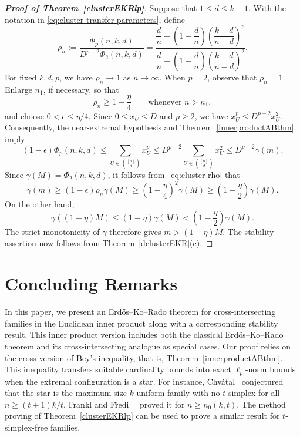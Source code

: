 \documentclass[11pt]{article}
\numberwithin{equation}{section}
\begin{document}
\begin{proof}[{\bf Proof of Theorem~\ref{clusterEKRlp}}]
Suppose that $1\leq d\leq k-1$.  With the notation in
	\eqref{eq:cluster-transfer-parameters}, define
	\begin{equation}\label{eq:cluster-rho}
		\rho_n:=
		\frac{\Phi_p(n,k,d)}{D^{p-2}\Phi_2(n,k,d)}
		=\frac{\dfrac dn+\left(1-\dfrac dn\right)
			\left(\dfrac{k-d}{n-d}\right)^p}
		{\dfrac dn+\left(1-\dfrac dn\right)
			\left(\dfrac{k-d}{n-d}\right)^2}.
	\end{equation}
For fixed $k,d,p$, we have $\rho_n\to1$ as $n\to\infty$.
When $p=2$, observe that $\rho_n=1$.
Enlarge $n_1$, if necessary, so that
	\[
	\rho_n\geq1-\frac\eta4
	\qquad\text{whenever }n>n_1,
	\]
	and choose $0<\epsilon\leq\eta/4$.  Since
	$0\leq x_U\leq D$ and $p\geq2$, we have
	$x_U^p\leq D^{p-2}x_U^2$.
Consequently, the near-extremal hypothesis and Theorem~\ref{innerproductABthm} imply
$$
		(1-\epsilon)\Phi_p(n,k,d) \leq\sum_{U\in\binom{[n]}d}x_U^p
\leq D^{p-2}\sum_{U\in\binom{[n]}d}x_U^2
		\leq D^{p-2}\gamma(m).
$$
	Since $\gamma(M)=\Phi_2(n,k,d)$, it follows from~\eqref{eq:cluster-rho}
	that
	\[
	\gamma(m)\geq(1-\epsilon)\rho_n \gamma(M)
	\geq\left(1-\frac\eta4\right)^2\gamma(M)
	\geq\left(1-\frac\eta2\right)\gamma(M).
	\]
	On the other hand,
	\[
	\gamma((1-\eta)M)\leq(1-\eta)\gamma(M)
	<\left(1-\frac\eta2\right)\gamma(M).
	\]
	The strict monotonicity of $\gamma$ therefore gives
	$m>(1-\eta)M$.  The stability assertion now follows from
	Theorem~\ref{dclusterEKR}(c).
\end{proof}

\section{Concluding Remarks}\label{ConclusionSec}


In this paper, we present an Erd\H{o}s--Ko--Rado theorem for cross-intersecting families in the Euclidean inner product along with a corresponding stability result.
This inner product version includes both the classical
Erd\H{o}s--Ko--Rado theorem and its cross-intersecting analogue as special cases.
Our proof relies on the cross version of Bey's inequality, that is, Theorem~\ref{innerproductABthm}.
This inequality transfers suitable cardinality bounds into exact
$\ell_p$-norm bounds when the extremal configuration is a star.
For instance, Chv\'atal~\cite{Chvatal} conjectured that the star is the maximum size $k$-uniform family with no $t$-simplex for all $n\geq (t+1)k/t$.
Frankl and F\"redi~~\cite{FranklF} proved it for $n\geq n_0(k,t)$.
The method proving of Theorem~\ref{clusterEKRlp} can be used to prove a similar result for $t$-simplex-free families.
\end{document}
